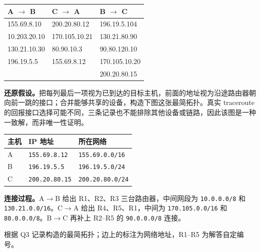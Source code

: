 \begin{center}
\small\ttfamily
\begin{tabular}{@{}lll@{}}
\toprule
\normalfont A $\to$ B & \normalfont C $\to$ A & \normalfont B $\to$ C \\
\midrule
155.69.8.10   & 200.20.80.12 & 196.19.5.104 \\
10.203.20.10  & 170.105.10.21 & 130.21.80.90 \\
130.21.10.30  & 80.90.10.3 & 90.80.120.10 \\
196.19.5.5    & 155.69.8.12 & 170.105.10.20 \\
              &             & 200.20.80.15 \\
\bottomrule
\end{tabular}
\end{center}

\begin{checkedsolution}
\textbf{还原假设。}把每列最后一项视为已到达的目标主机，前面的地址视为沿途路由器朝向前一跳的接口；合并能够共享的设备，构造下图这张最简拓扑。真实 traceroute 的回报接口选择可能不同，三条记录也不能排除其他设备或链路，因此该图是一种一致解，而非唯一性证明。

\begin{center}
\small
\begin{tabular}{@{}lll@{}}
\toprule
主机 & IP 地址 & 所在网络 \\
\midrule
A & \texttt{155.69.8.12} & \texttt{155.69.0.0/16} \\
B & \texttt{196.19.5.5} & \texttt{196.19.5.0/24} \\
C & \texttt{200.20.80.15} & \texttt{200.20.80.0/24} \\
\bottomrule
\end{tabular}
\end{center}

\textbf{连接过程。}A$\to$B 给出 R1、R2、R3 三台路由器，中间网段为 \texttt{10.0.0.0/8} 和 \texttt{130.21.0.0/16}。C$\to$A 给出 R4、R5、R1，中间为 \texttt{170.105.0.0/16} 和 \texttt{80.0.0.0/8}。B$\to$C 再补上 R2--R5 的 \texttt{90.0.0.0/8} 连接。

\begin{center}


{\footnotesize 根据 Q3 记录构造的最简拓扑；边上的标注为网络地址，R1--R5 为解答自定编号。}
\end{center}


\end{checkedsolution}

